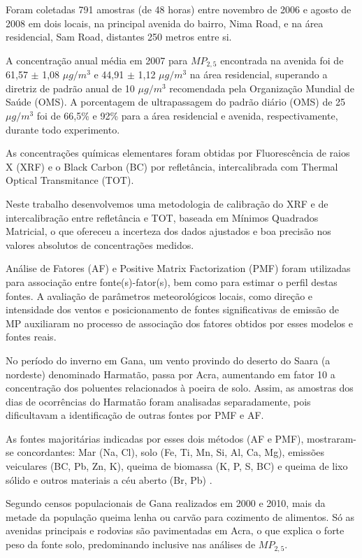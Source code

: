 Foram coletadas 791 amostras (de 48 horas) entre novembro de 2006 e 
agosto de 2008 em dois locais, na principal avenida do bairro, Nima Road, e na área 
residencial, Sam Road, distantes 250 metros entre si. 

A concentração anual média em 2007 para $MP_{2,5}$ encontrada na avenida 
foi de 61,57 $\pm$ 1,08 $\mu g/m^3$ e 44,91 $\pm$ 1,12 $\mu g/m^3$ na área residencial, 
superando a diretriz de padrão anual de 10 $\mu g/m^3$ recomendada pela 
Organização Mundial de Saúde (OMS). A porcentagem de ultrapassagem 
do padrão diário (OMS) de 25 $\mu g/m^3$ foi de 66,5\% e 92\% para a área residencial e avenida, respectivamente, durante todo experimento. 

As concentrações químicas elementares foram obtidas por 
Fluorescência de raios X (XRF) e o Black Carbon (BC) por 
refletância, intercalibrada com Thermal Optical Transmitance (TOT). 

Neste trabalho desenvolvemos uma metodologia de calibração do XRF 
e de intercalibração entre refletância e TOT, 
baseada em Mínimos Quadrados Matricial, o que ofereceu a 
incerteza dos dados ajustados e boa precisão nos valores 
absolutos de concentrações medidos.

Análise de Fatores (AF) e Positive Matrix Factorization (PMF) foram utilizadas
para associação entre fonte(s)-fator(s), bem como para estimar o perfil destas fontes. 
A avaliação de parâmetros meteorológicos locais, como direção e intensidade 
dos ventos e posicionamento de fontes significativas de emissão de MP 
auxiliaram no processo de associação dos fatores obtidos por esses modelos e 
fontes reais. 

No período do inverno em Gana, um vento  
provindo do deserto do Saara (a nordeste) denominado Harmatão, 
passa por Acra, aumentando em fator 10 a concentração dos poluentes 
relacionados à poeira de solo. Assim, as amostras dos dias de ocorrências 
do Harmatão foram analisadas separadamente, pois dificultavam a 
identificação de outras fontes por PMF e AF.

As fontes majoritárias indicadas por esses dois métodos (AF e PMF), 
mostraram-se concordantes: Mar (Na, Cl), solo (Fe, Ti, Mn, 
Si, Al, Ca, Mg), emissões veiculares (BC, Pb, Zn, K), queima de 
biomassa (K, P, S, BC) e queima de lixo sólido e outros materiais a céu aberto (Br, Pb) . 

Segundo censos populacionais de Gana realizados em 2000 e 2010, 
mais da metade da população queima lenha ou carvão para cozimento 
de alimentos. Só as avenidas principais e rodovias são pavimentadas em Acra, o que explica o forte peso da fonte solo, predominando 
inclusive nas análises de $MP_{2,5}$.

